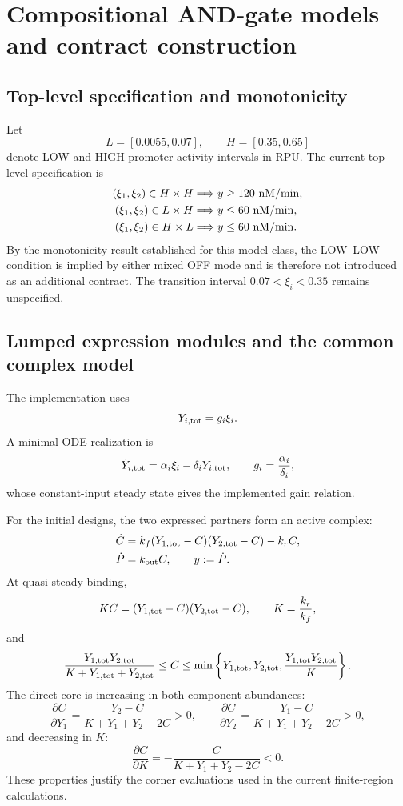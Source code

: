 
\section{Compositional AND-gate models and contract construction}
\label{sec:and_gate_model_notes}

\subsection{Top-level specification and monotonicity}

Let
\[
L=[0.0055,0.07],\qquad H=[0.35,0.65]
\]
denote LOW and HIGH promoter-activity intervals in RPU. The current top-level
specification is
\begin{align}
(\xi_1,\xi_2)\in H\times H &\Longrightarrow y\ge 120~{\rm nM/min},\\
(\xi_1,\xi_2)\in L\times H &\Longrightarrow y\le 60~{\rm nM/min},\\
(\xi_1,\xi_2)\in H\times L &\Longrightarrow y\le 60~{\rm nM/min}.
\end{align}
By the monotonicity result established for this model class, the LOW--LOW
condition is implied by either mixed OFF mode and is therefore not introduced
as an additional contract. The transition interval
$0.07<\xi_i<0.35$ remains unspecified.

\subsection{Lumped expression modules and the common complex model}

The implementation uses
\[
Y_{i,\rm tot}=g_i\xi_i.
\]
A minimal ODE realization is
\[
\dot Y_{i,\rm tot}=\alpha_i\xi_i-\delta_iY_{i,\rm tot},
\qquad
g_i=\frac{\alpha_i}{\delta_i},
\]
whose constant-input steady state gives the implemented gain relation.

For the initial designs, the two expressed partners form an active complex:
\begin{align}
\dot C&=k_f(Y_{1,\rm tot}-C)(Y_{2,\rm tot}-C)-k_rC,\\
\dot P&=k_{\rm out}C,\qquad y:=\dot P.
\end{align}
At quasi-steady binding,
\[
KC=(Y_{1,\rm tot}-C)(Y_{2,\rm tot}-C),
\qquad K=\frac{k_r}{k_f},
\]
and
\[
\frac{Y_{1,\rm tot}Y_{2,\rm tot}}{K+Y_{1,\rm tot}+Y_{2,\rm tot}}
\le C\le
\min\left\{Y_{1,\rm tot},Y_{2,\rm tot},
\frac{Y_{1,\rm tot}Y_{2,\rm tot}}{K}\right\}.
\]
The direct core is increasing in both component abundances:
\[
\frac{\partial C}{\partial Y_1}
=
\frac{Y_2-C}{K+Y_1+Y_2-2C}>0,\qquad
\frac{\partial C}{\partial Y_2}
=
\frac{Y_1-C}{K+Y_1+Y_2-2C}>0,
\]
and decreasing in $K$:
\[
\frac{\partial C}{\partial K}
=
-\frac{C}{K+Y_1+Y_2-2C}<0.
\]
These properties justify the corner evaluations used in the current
finite-region calculations.

